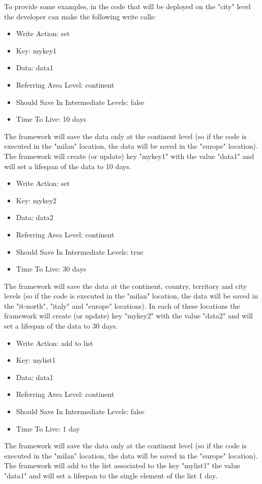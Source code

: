 To provide some examples, in the code that will be deployed on the "city" level the developer can make the following write calls:

\begin{example}
\begin{itemize}
    \item Write Action: set
    \item Key: mykey1
    \item Data: data1
    \item Referring Area Level: continent
    \item Should Save In Intermediate Levels: false
    \item Time To Live: 10 days
\end{itemize}
The framework will save the data only at the continent level (so if the code is executed in the "milan" location, the data will be saved in the "europe" location). The framework will create (or update) key "mykey1" with the value "data1" and will set a lifespan of the data to 10 days.
\end{example}

\begin{example}
\begin{itemize}
    \item Write Action: set
    \item Key: mykey2
    \item Data: data2
    \item Referring Area Level: continent
    \item Should Save In Intermediate Levels: true
    \item Time To Live: 30 days
\end{itemize}
The framework will save the data at the continent, country, territory and city levels (so if the code is executed in the "milan" location, the data will be saved in the "it-north", "italy" and "europe" locations). In each of these locations the framework will create (or update) key "mykey2" with the value "data2" and will set a lifespan of the data to 30 days.
\end{example}

\begin{example}
\begin{itemize}
    \item Write Action: add to list
    \item Key: mylist1
    \item Data: data1
    \item Referring Area Level: continent
    \item Should Save In Intermediate Levels: false
    \item Time To Live: 1 day
\end{itemize}
The framework will save the data only at the continent level (so if the code is executed in the "milan" location, the data will be saved in the "europe" location). The framework will add to the list associated to the key "mylist1" the value "data1" and will set a lifespan to the single element of the list 1 day.
\end{example}


